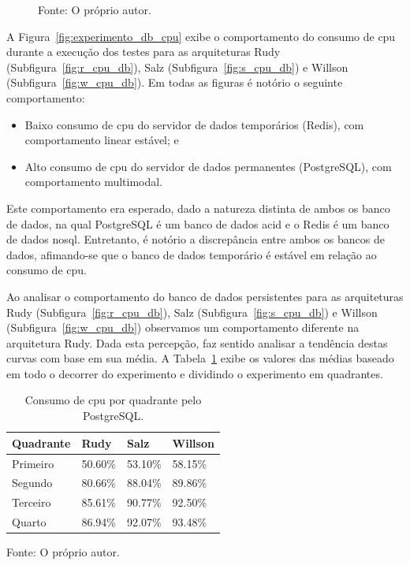 \begin{figure}[htb!]
    Fonte: O próprio autor.
\end{figure}


A Figura~\ref{fig:experimento_db_cpu} exibe o comportamento do consumo de \ac{cpu} durante a execução dos testes para as arquiteturas Rudy (Subfigura~\ref{fig:r_cpu_db}), Salz (Subfigura~\ref{fig:s_cpu_db}) e Willson (Subfigura~\ref{fig:w_cpu_db}).
%
Em todas as figuras é notório o seguinte comportamento:

\begin{itemize}
 \item Baixo consumo de \ac{cpu} do servidor de dados temporários (Redis), com comportamento linear estável; e
 \item Alto consumo de \ac{cpu} do servidor de dados permanentes (PostgreSQL), com comportamento multimodal.
\end{itemize}

Este comportamento era esperado, dado a natureza distinta de ambos os banco de dados, na qual PostgreSQL é um banco de dados \ac{acid} e o Redis é um banco de dados \ac{nosql}.
%
Entretanto, é notório a discrepância entre ambos os bancos de dados, afimando-se que o banco de dados temporário é estável em relação ao consumo de \ac{cpu}.

Ao analisar o comportamento do banco de dados persistentes para as arquiteturas Rudy (Subfigura~\ref{fig:r_cpu_db}), Salz (Subfigura~\ref{fig:s_cpu_db}) e Willson (Subfigura~\ref{fig:w_cpu_db}) observamos um comportamento diferente na arquitetura Rudy.
%
Dada esta percepção, faz sentido analisar a tendência destas curvas com base em sua média.
%
A Tabela~\ref{tab:cpu_db_media_quadrantes} exibe os valores das médias baseado em todo o decorrer do experimento e dividindo o experimento em quadrantes.

\begin{table}[htb!]
\centering
\begin{adjustbox}{max width=\textwidth}
\caption{Consumo de \ac{cpu} por quadrante pelo PostgreSQL.}
\label{tab:cpu_db_media_quadrantes}
\begin{tabular}{l|l|l|l}

\hline \hline

Quadrante & Rudy    & Salz    & Willson \\ \hline \hline

Primeiro  & 50.60\% & 53.10\% & 58.15\% \\ \hline

Segundo   & 80.66\% & 88.04\% & 89.86\% \\ \hline

Terceiro  & 85.61\% & 90.77\% & 92.50\% \\ \hline

Quarto    & 86.94\% & 92.07\% & 93.48\% \\ \hline \hline

\end{tabular}

\end{adjustbox}

Fonte: O próprio autor.
\end{table}

